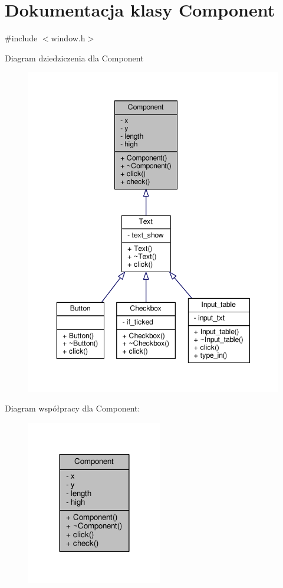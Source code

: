 \hypertarget{classComponent}{}\section{Dokumentacja klasy Component}
\label{classComponent}


{\ttfamily \#include $<$window.\+h$>$}



Diagram dziedziczenia dla Component\nopagebreak
\begin{figure}[H]
\begin{center}
\leavevmode
\includegraphics[width=350pt]{classComponent__inherit__graph}
\end{center}
\end{figure}


Diagram współpracy dla Component\+:\nopagebreak
\begin{figure}[H]
\begin{center}
\leavevmode
\includegraphics[width=168pt]{classComponent__coll__graph}
\end{center}
\end{figure}

